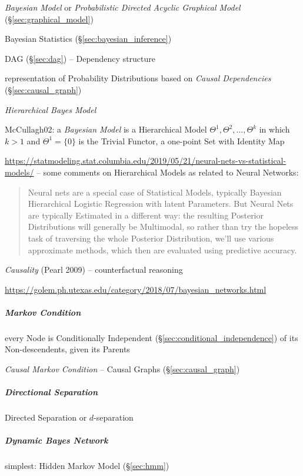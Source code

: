 \emph{Bayesian Model} or \emph{Probabilistic Directed Acyclic Graphical Model}
(\S\ref{sec:graphical_model})

Bayesian Statistics (\S\ref{sec:bayesian_inference})

DAG (\S\ref{sec:dag}) -- Dependency structure

representation of Probability Distributions based on \emph{Causal Dependencies}
(\S\ref{sec:causal_graph})

\emph{Hierarchical Bayes Model}

McCullagh02: a \emph{Bayesian Model} is a Hierarchical Model
$\Theta^1, \Theta^2, \ldots, \Theta^k$ in which $k > 1$ and $\Theta^1 = \{0\}$
is the Trivial Functor, a one-point Set with Identity Map

\url{https://statmodeling.stat.columbia.edu/2019/05/21/neural-nets-vs-statistical-models/}
-- some comments on Hierarchical Models as related to Neural Networks:
\begin{quote}
  Neural nets are a special case of Statistical Models, typically Bayesian
  Hierarchical Logistic Regression with latent Parameters. But Neural Nets are
  typically Estimated in a different way: the resulting Posterior Distributions
  will generally be Multimodal, so rather than try the hopeless task of
  traversing the whole Posterior Distribution, we’ll use various approximate
  methods, which then are evaluated using predictive accuracy.
\end{quote}

\emph{Causality} (Pearl 2009) -- counterfactual reasoning

\url{https://golem.ph.utexas.edu/category/2018/07/bayesian_networks.html}



\subparagraph{Markov Condition}\label{sec:markov_condition}\hfill

every Node is Conditionally Independent (\S\ref{sec:conditional_independence})
of its Non-descendents, given its Parents

\emph{Causal Markov Condition}
--
Causal Graphs (\S\ref{sec:causal_graph})



\subparagraph{Directional Separation}\label{sec:directional_separation}\hfill

Directed Separation or $d$-separation



\subparagraph{Dynamic Bayes Network}\label{sec:dynamic_bayes_network}\hfill

simplest: Hidden Markov Model (\S\ref{sec:hmm})


